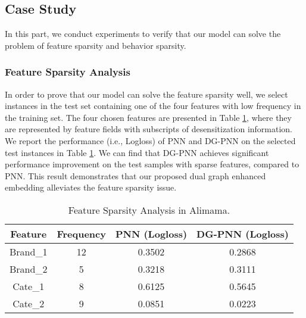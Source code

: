 \subsection{Case Study}
In this part, we conduct experiments to verify that our model can solve the problem of feature sparsity and behavior sparsity.

\subsubsection{Feature Sparsity Analysis}
In order to prove that our model can solve the feature sparsity well, we select instances in the test set containing one of the four features with low frequency in the training set. The four chosen features are presented in Table \ref{tab:CaseStudy}, where they are represented by feature fields with subscripts of desensitization information. We report the performance (i.e., Logloss) of PNN and DG-PNN on the selected test instances in Table \ref{tab:CaseStudy}. We can find that DG-PNN achieves significant performance improvement on the test samples with sparse features, compared to PNN. This result demonstrates that our proposed  dual graph enhanced embedding alleviates the feature sparsity issue.


\begin{table}[htp]
\setlength{\abovecaptionskip}{0.1cm}
\setlength{\belowcaptionskip}{-0.0cm}
\caption{Feature Sparsity Analysis in Alimama.}
    \centering
\scalebox{0.9}
{
\small
\begin{tabular}{c|c|c|c}
\midrule[0.25ex]
Feature &  Frequency & PNN (Logloss) & DG-PNN (Logloss) \\ \hline 
Brand\_{1} & 12 & 0.3502 & 0.2868 \\
Brand\_{2} & 5 & 0.3218 & 0.3111  \\ 
Cate\_{1} & 8 & 0.6125 & 0.5645    \\ 
Cate\_{2} & 9 & 0.0851 & 0.0223    \\ 
\hline \hline
\end{tabular}}
\label{tab:CaseStudy}
\end{table}
